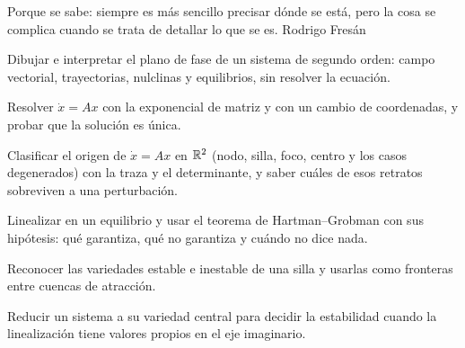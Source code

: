 
  {Porque se sabe: siempre es más sencillo precisar dónde se está, pero la cosa se complica cuando se trata de detallar lo que se es.}
  {Rodrigo Fresán}

\begin{objetivos}
  \item Dibujar e interpretar el plano de fase de un sistema de segundo orden: campo vectorial, trayectorias, nulclinas y equilibrios, sin resolver la ecuación.
  \item Resolver $\dot x=Ax$ con la exponencial de matriz y con un cambio de coordenadas, y probar que la solución es única.
  \item Clasificar el origen de $\dot x=Ax$ en $\mathbb{R}^2$ (nodo, silla, foco, centro y los casos degenerados) con la traza y el determinante, y saber cuáles de esos retratos sobreviven a una perturbación.
  \item Linealizar en un equilibrio y usar el teorema de Hartman--Grobman con sus hipótesis: qué garantiza, qué no garantiza y cuándo no dice nada.
  \item Reconocer las variedades estable e inestable de una silla y usarlas como fronteras entre cuencas de atracción.
  \item Reducir un sistema a su variedad central para decidir la estabilidad cuando la linealización tiene valores propios en el eje imaginario.
\end{objetivos}










